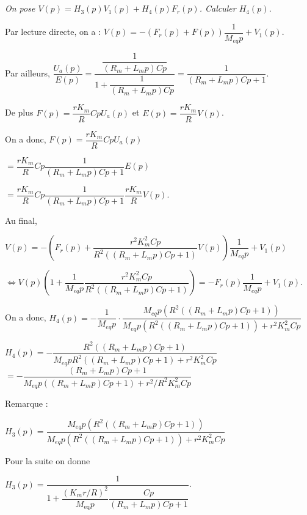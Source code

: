 \documentclass[10pt,fleqn]{article} %
\begin{document}
\subparagraph{}
\textit{On pose $V(p) = H_3(p) V_1(p) + H_4(p) F_r(p)$. Calculer $H_4(p)$.}
\ifprof
\begin{corrige}
Par lecture directe, on a : $V(p)=-\left( F_r(p)  + F(p)\right)\dfrac{1}{M_{eq}p} + V_1(p)$.

Par ailleurs, $\dfrac{U_a(p)}{E(p)}=\dfrac{\dfrac{1}{\left(R_m + L_m p \right)Cp}}{1+\dfrac{1}{\left(R_m + L_m p \right)Cp}}=\dfrac{1}{\left(R_m + L_m p \right)Cp+1}$.


De plus $F(p)=\dfrac{rK_m}{R}Cp U_a (p)$ et $E(p)=\dfrac{rK_m}{R} V(p)$.


On a donc, $F(p)=\dfrac{rK_m}{R}Cp U_a (p)$
 
$= \dfrac{rK_m}{R}Cp \dfrac{1}{\left(R_m + L_m p \right)Cp+1} E(p)$ 

$= \dfrac{rK_m}{R}Cp \dfrac{1}{\left(R_m + L_m p \right)Cp+1} \dfrac{rK_m}{R} V(p)$.


Au final, 

$V(p)=-\left( F_r(p)  + \dfrac{r^2K_m^2Cp}{R^2\left(\left(R_m + L_m p \right)Cp+1\right)}  V(p)\right)\dfrac{1}{M_{eq}p} + V_1(p)$ 

$\Leftrightarrow V(p)\left(1+ \dfrac{1}{M_{eq}p} \dfrac{r^2K_m^2Cp}{R^2\left(\left(R_m + L_m p \right)Cp+1\right)}\right)=-F_r(p)  \dfrac{1}{M_{eq}p} + V_1(p)$.

On a donc, 
$H_4(p)=-\dfrac{1}{M_{eq}p}\cdot\dfrac{M_{eq}p \left( R^2\left(\left(R_m + L_m p \right)Cp+1\right) \right)}{M_{eq}p \left( R^2\left(\left(R_m + L_m p \right)Cp+1\right) \right)+r^2K_m^2Cp}$ 

$H_4(p)=-\dfrac{R^2\left(\left(R_m + L_m p \right)Cp+1\right) }{M_{eq}p  R^2\left(\left(R_m + L_m p \right)Cp+1\right) +r^2K_m^2Cp}$
$=-\dfrac{\left(R_m + L_m p \right)Cp+1 }{M_{eq}p  \left(\left(R_m + L_m p \right)Cp+1\right) +r^2/R^2 K_m^2Cp}$


Remarque : 

$H_3(p)=\dfrac{M_{eq}p \left( R^2\left(\left(R_m + L_m p \right)Cp+1\right) \right)}{M_{eq}p \left( R^2\left(\left(R_m + L_m p \right)Cp+1\right) \right)+r^2K_m^2Cp}$ 


\end{corrige}
\else
\fi

Pour la suite on donne

$H_3(p)=\dfrac{1}{1+\dfrac{\left(K_m r/R\right)^2}{M_{\text{eq}}p}\dfrac{Cp}{\left(R_m + L_m p\right)Cp+1}}$.
\end{document}
